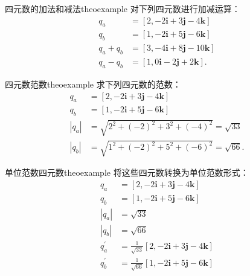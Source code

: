 \begin{myexample}{四元数的加法和减法}{theoexample}
对下列四元数进行加减运算：
$$
    \begin{aligned}
        q_{a}       & =[2,-2 \mathbf{i}+3 \mathbf{j}-4 \mathbf{k}]  \\
        q_{b}       & =[1,-2 \mathbf{i}+5 \mathbf{j}-6 \mathbf{k}]  \\
        q_{a}+q_{b} & =[3,-4 \mathbf{i}+8 \mathbf{j}-10 \mathbf{k}] \\
        q_{a}-q_{b} & =[1,0 \mathbf{i}-2 \mathbf{j}+2 \mathbf{k}] .
    \end{aligned}
$$
\end{myexample}

\begin{myexample}{四元数范数}{theoexample}
求下列四元数的范数：
$$
    \begin{aligned}
        q_{a}              & =[2,-2 \mathbf{i}+3 \mathbf{j}-4 \mathbf{k}]      \\
        q_{b}              & =[1,-2 \mathbf{i}+5 \mathbf{j}-6 \mathbf{k}]      \\
        \left|q_{a}\right| & =\sqrt{2^{2}+(-2)^{2}+3^{2}+(-4)^{2}}=\sqrt{33}   \\
        \left|q_{b}\right| & =\sqrt{1^{2}+(-2)^{2}+5^{2}+(-6)^{2}}=\sqrt{66} .
    \end{aligned}
$$
\end{myexample}

\begin{myexample}{单位范数四元数}{theoexample}
将这些四元数转换为单位范数形式：
$$
    \begin{aligned}
        q_{a}              & =[2,-2 \mathbf{i}+3 \mathbf{j}-4 \mathbf{k}]                    \\
        q_{b}              & =[1,-2 \mathbf{i}+5 \mathbf{j}-6 \mathbf{k}]                    \\
        \left|q_{a}\right| & =\sqrt{33}                                                      \\
        \left|q_{b}\right| & =\sqrt{66}                                                      \\
        q_{a}^{\prime}     & =\frac{1}{\sqrt{33}}[2,-2 \mathbf{i}+3 \mathbf{j}-4 \mathbf{k}] \\
        q_{b}^{\prime}     & =\frac{1}{\sqrt{66}}[1,-2 \mathbf{i}+5 \mathbf{j}-6 \mathbf{k}]
    \end{aligned}
$$
\end{myexample}

